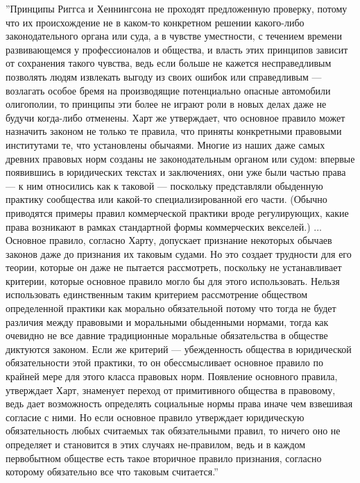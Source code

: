 \documentclass[11pt]{book}
\begin{document}
\smallskip
{}\relax
{}\relax
''Принципы Риггса и Хеннингсона не проходят предложенную проверку, потому что их происхождение не в каком-то конкретном решении какого-либо законодательного органа или суда, а в чувстве уместности, с течением времени развивающемся у профессионалов и общества, и власть этих принципов зависит от сохранения такого чувства, ведь если больше не кажется несправедливым позволять людям извлекать выгоду из своих ошибок или справедливым --- возлагать особое бремя на производящие потенциально опасные автомобили олигополии, то принципы эти более не играют роли в новых делах даже не будучи когда-либо отменены. Харт же утверждает, что основное правило может назначить законом не только те правила, что приняты конкретными правовыми институтами те, что установлены обычаями. Многие из наших даже самых древних правовых норм созданы не законодательным органом или судом: впервые появившись в юридических текстах и заключениях, они уже были частью права --- к ним относились как к таковой --- поскольку представляли обыденную практику сообщества или какой-то специализированной его части. (Обычно приводятся примеры правил коммерческой практики вроде регулирующих, какие права возникают в рамках стандартной формы коммерческих векселей.) ... Основное правило, согласно Харту, допускает признание некоторых обычаев законов даже до признания их таковым судами. Но это создает трудности для его теории, которые он даже не пытается рассмотреть, поскольку не устанавливает критерии, которые основное правило могло бы для этого использовать. Нельзя использовать единственным таким критерием рассмотрение обществом определенной практики как морально обязательной потому что тогда не будет различия между правовыми и моральными обыденными нормами, тогда как очевидно не все давние традиционные моральные обязательства в обществе диктуются законом. Если же критерий --- убежденность общества в юридической обязательности этой практики, то он обессмысливает основное правило по крайней мере для этого класса правовых норм. Появление основного правила, утверждает Харт, знаменует переход от примитивного общества в правовому, ведь дает возможность определять социальные нормы права иначе чем взвешивая согласие с ними. Но если основное правило утверждает юридическую обязательность любых считаемых так обязательными правил, то ничего оно не определяет и становится в этих случаях не-правилом, ведь и в каждом первобытном обществе есть такое вторичное правило признания, согласно которому обязательно все что таковым считается.''
\end{document}
